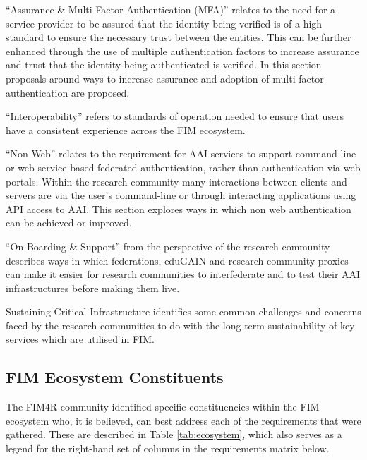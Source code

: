 \documentclass[fleqn,11pt]{wlscirep}
\begin{document}
{“Assurance \& Multi Factor Authentication (MFA)” relates to the need for a service provider to be assured that the identity being verified is of a high standard to ensure the necessary trust between the entities.  This can be further enhanced through the use of multiple authentication factors to increase assurance and trust that the identity being authenticated is verified.  In this section proposals around ways to increase assurance and adoption of multi factor authentication are proposed. 

“Interoperability” refers to standards of operation needed to ensure that users have a consistent experience across the FIM ecosystem. 

“Non Web” relates to the requirement for AAI services to support command line or web service based federated authentication, rather than authentication via web portals.  Within the research community many interactions between clients and servers are via the user's command-line or through interacting applications using API access to AAI.  This section explores ways in which non web authentication can be achieved or improved.  

“On-Boarding \& Support” from the perspective of the research community describes ways in which federations, eduGAIN and research community proxies can make it easier for research communities to interfederate and to test their AAI infrastructures before making them live.

Sustaining Critical Infrastructure identifies some common challenges and concerns faced by the research communities to do with the long term sustainability of key services which are utilised in FIM. 

\subsection{FIM Ecosystem Constituents}
The FIM4R community identified specific constituencies within the FIM ecosystem who, it is believed, can best address each of the requirements that were gathered. These are described in Table \ref{tab:ecosystem}, which also serves as a legend for the right-hand set of columns in the requirements matrix below.

}
\end{document}
